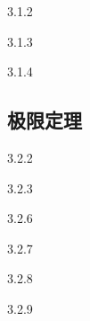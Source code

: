    
\begin{solution}

\end{solution}


  {3.1.2}

   
\begin{solution}

\end{solution}


  {3.1.3}

   
\begin{solution}

\end{solution}


  {3.1.4}

   
\begin{solution}

\end{solution}

\subsection{极限定理}
  {3.2.2}

   
\begin{solution}

\end{solution}



  {3.2.3}

   
\begin{solution}

\end{solution}


  {3.2.6}

   
\begin{solution}

\end{solution}


  {3.2.7}

   
\begin{solution}

\end{solution}


  {3.2.8}

   
\begin{solution}

\end{solution}


  {3.2.9}

   
\begin{solution}

\end{solution}


